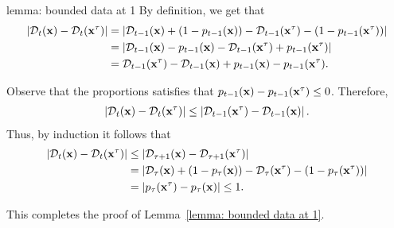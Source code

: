 \begin{proofof}{lemma: bounded data at 1}
By definition, we get that
\begin{align*}
\left| \mathcal{D}_t({\bf{x}}) - \mathcal{D}_t({\bf{x}}^\tau) \right| &= \left| \mathcal{D}_{t-1}({\bf{x}}) + (1-p_{t-1}({\bf{x}})) - \mathcal{D}_{t-1}({\bf{x}}^\tau) - (1-p_{t-1}({\bf{x}}^\tau)) \right| \\
&= \left| \mathcal{D}_{t-1}({\bf{x}}) -p_{t-1}({\bf{x}}) - \mathcal{D}_{t-1}({\bf{x}}^\tau) + p_{t-1}({\bf{x}}^\tau) \right| \\
&= \mathcal{D}_{t-1}({\bf{x}}^\tau) - \mathcal{D}_{t-1}({\bf{x}}) + p_{t-1}({\bf{x}}) - p_{t-1}({\bf{x}}^\tau).
\end{align*}

Observe that the proportions satisfies that $p_{t-1}({\bf{x}}) - p_{t-1}({\bf{x}}^\tau) \leq 0$. Therefore,
\begin{align*}    
\left| \mathcal{D}_t({\bf{x}}) - \mathcal{D}_t({\bf{x}}^\tau) \right| \leq \left| \mathcal{D}_{t-1}({\bf{x}}^\tau) - \mathcal{D}_{t-1}({\bf{x}}) \right|.
\end{align*}
Thus, by induction it follows that
\begin{align*}
\left| \mathcal{D}_t({\bf{x}}) - \mathcal{D}_t({\bf{x}}^\tau) \right| &\leq \left| \mathcal{D}_{\tau + 1}({\bf{x}}) - \mathcal{D}_{\tau + 1}({\bf{x}}^\tau) \right| \\
&= \left| \mathcal{D}_{\tau}({\bf{x}}) + (1-p_{\tau}({\bf{x}})) - \mathcal{D}_{\tau}({\bf{x}}^\tau) - (1-p_{\tau}({\bf{x}}^\tau)) \right| \\
&= \left| p_{\tau}({\bf{x}}^\tau) - p_{\tau}({\bf{x}}) \right| \leq 1.
\end{align*}

This completes the proof of Lemma~\ref{lemma: bounded data at 1}.
\end{proofof}



